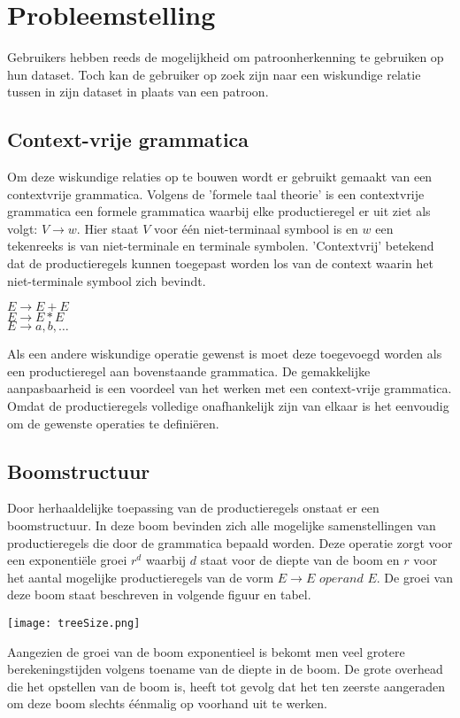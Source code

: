 \documentclass[Main.tex]{subfiles}
\begin{document}
\section{Probleemstelling}
Gebruikers hebben reeds de mogelijkheid om patroonherkenning te gebruiken op hun dataset. Toch kan de gebruiker op zoek zijn naar een wiskundige relatie tussen in zijn dataset in plaats van een patroon.
\subsection{Context-vrije grammatica}
Om deze wiskundige relaties op te bouwen wordt er gebruikt gemaakt van een contextvrije grammatica. Volgens de 'formele taal theorie' is een contextvrije grammatica een formele grammatica waarbij elke productieregel er uit ziet als volgt: $V \rightarrow w$. Hier staat $V$  voor \'e\'en niet-terminaal symbool is en $w$ een tekenreeks is van niet-terminale en terminale symbolen. 'Contextvrij' betekend dat de productieregels kunnen toegepast worden los van de context waarin het niet-terminale symbool zich bevindt. \\

\begin{framed}
\begin{center}
$E \rightarrow E + E$ \\
$E \rightarrow E \ast E$ \\
$E \rightarrow a,b,\dotsc$
\end{center}
\end{framed}

Als een andere wiskundige operatie gewenst is moet deze toegevoegd worden als een productieregel aan bovenstaande grammatica. De gemakkelijke aanpasbaarheid is een voordeel van het werken met een context-vrije grammatica. Omdat de productieregels volledige onafhankelijk zijn van elkaar is het eenvoudig om de gewenste operaties te defini\"eren.

\subsection{Boomstructuur}

Door herhaaldelijke toepassing van de productieregels onstaat er een boomstructuur. In deze boom bevinden zich alle mogelijke samenstellingen van productieregels die door de grammatica bepaald worden. Deze operatie zorgt voor een exponenti\"ele groei $r^{d}$ waarbij $d$ staat voor de diepte van de boom en $r$ voor het aantal mogelijke productieregels van de vorm $E \rightarrow E$  $operand$ $ E$. De groei van deze boom staat beschreven in volgende figuur en tabel.
\begin{center}
\texttt{[image: treeSize.png]}
\end{center}
Aangezien de groei van de boom exponentieel is bekomt men veel grotere berekeningstijden volgens toename van de diepte in de boom. De grote overhead die het opstellen van de boom is, heeft tot gevolg dat het ten zeerste aangeraden om deze boom slechts \'e\'enmalig op voorhand uit te werken.
\end{document}
